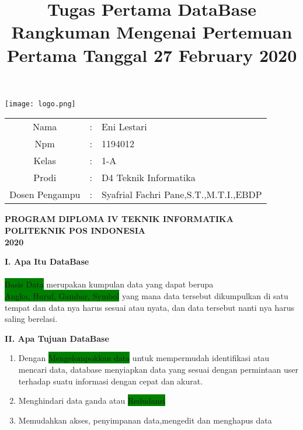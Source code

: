 \documentclass[a4paper,12pt]{article}
\title{\large{\textbf{Tugas Pertama DataBase}\\}Rangkuman Mengenai Pertemuan Pertama Tanggal 27 February 2020}
\date{}
\newcommand{\hilight}[1]{\colorbox{green} {#1}}
\begin{document}
\maketitle
\begin{center}
    \texttt{[image: logo.png]}
\end{center}
\vspace{-0.1cm}
\begin{center}
\begin{tabular}{ c c l }

  Nama & : & Eni Lestari \\
  Npm & : & 1194012 \\
  Kelas & : & 1-A \\
  Prodi & : & D4 Teknik Informatika \\
  Dosen Pengampu & : & Syafrial Fachri Pane,S.T.,M.T.I.,EBDP

\end{tabular}
\vfill
\textbf{PROGRAM DIPLOMA IV TEKNIK INFORMATIKA}\\
\textbf{POLITEKNIK POS INDONESIA}\\
\textbf{2020}\\
\end{center} 

\newpage 

	\textbf{I. Apa Itu DataBase}
	\vspace{-0.3cm}
	\paragraph{}
			\hilight{Basis Data} merupakan kumpulan data yang dapat berupa \\ \hilight{Angka, Huruf, Gambar, Symbol} yang mana data tersebut dikumpulkan di satu tempat dan data nya harus sesuai atau nyata, dan data tersebut nanti nya harus saling berelasi.
			
	\vspace{0.8cm}
	\textbf{II. Apa Tujuan DataBase}
	\begin{enumerate}
			\item Dengan \hilight{Mengelompokkan data} untuk mempermudah identifikasi atau mencari data, database menyiapkan data yang sesuai dengan permintaan user terhadap suatu informasi dengan cepat dan akurat. 
			\item Menghindari data ganda atau \hilight {Redudansi}
			\item Memudahkan akses, penyimpanan data,mengedit dan menghapus data 
	\end{enumerate}
	\vspace{0.8cm}
\end{document}
